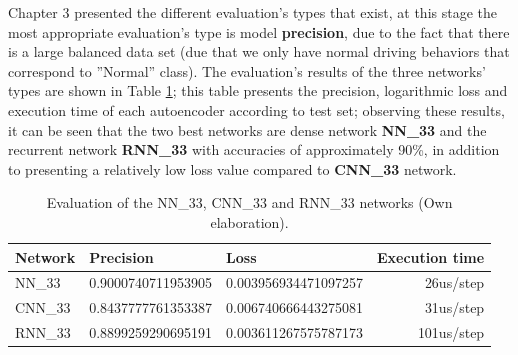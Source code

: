 Chapter 3 presented the different evaluation's types that exist, at this stage the most appropriate evaluation's type is model \textbf{precision}, due to the fact that there is a large balanced data set (due that we only have normal driving behaviors that correspond to ''Normal'' class). The evaluation's results of the three networks' types are shown in Table \ref{table:evaluacion_redes}; this table presents the precision, logarithmic loss and execution time of each autoencoder according to test set; observing these results, it can be seen that the two best networks are dense network \textbf{NN\_33} and the recurrent network \textbf{RNN\_33} with accuracies of approximately 90\%, in addition to presenting a relatively low loss value compared to \textbf{CNN\_33} network.

\begin{table}[H]
\centering
\begin{center}
\begin{tabular}{|l|r|r|r|}
\hline
\textbf{Network} & \multicolumn{1}{l|}{\textbf{Precision}} & \multicolumn{1}{l|}{\textbf{Loss}} & \multicolumn{1}{l|}{\textbf{Execution time}} \\ \hline
NN\_33              & 0.9000740711953905  & 0.003956934471097257  & 26us/step  \\ \hline
CNN\_33             & 0.8437777761353387  & 0.006740666443275081  & 31us/step  \\ \hline
RNN\_33             & 0.8899259290695191  & 0.003611267575787173  & 101us/step \\ \hline
\end{tabular}
\end{center}
\caption{Evaluation of the NN\_33, CNN\_33 and RNN\_33 networks (Own elaboration).}
\label{table:evaluacion_redes}
\end{table}

